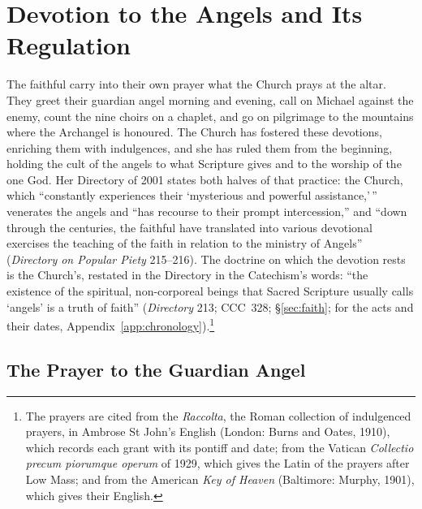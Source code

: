 \section{Devotion to the Angels and Its Regulation}\label{sec:devotion}

The faithful carry into their own prayer what the Church prays at the
altar. They greet their guardian angel morning and evening, call on
Michael against the enemy, count the nine choirs on a chaplet, and go on
pilgrimage to the mountains where the Archangel is honoured. The Church
has fostered these devotions, enriching them with indulgences, and she has
ruled them from the beginning, holding the cult of the angels to what
Scripture gives and to the worship of the one God. Her Directory of 2001
states both halves of that practice: the Church, which ``constantly
experiences their `mysterious and powerful assistance,'\,'' venerates the
angels and ``has recourse to their prompt intercession,'' and ``down
through the centuries, the faithful have translated into various
devotional exercises the teaching of the faith in relation to the
ministry of Angels'' (\emph{Directory on Popular Piety} 215--216). The
doctrine on which the devotion rests is the Church's, restated in the
Directory in the Catechism's words: ``the existence of the spiritual,
non-corporeal beings that Sacred Scripture usually calls `angels' is a
truth of faith'' (\emph{Directory} 213; CCC~328; \S\ref{sec:faith}; for the acts and their dates,
Appendix~\ref{app:chronology}).\footnote{The prayers are
cited from the \emph{Raccolta}, the Roman collection of indulgenced
prayers, in Ambrose St John's English (London: Burns and Oates, 1910),
which records each grant with its pontiff and date; from the Vatican
\emph{Collectio precum piorumque operum} of 1929, which gives the Latin of
the prayers after Low Mass; and from the American \emph{Key of Heaven}
(Baltimore: Murphy, 1901), which gives their English.}

\sectionguard
\subsection{The Prayer to the Guardian Angel}

